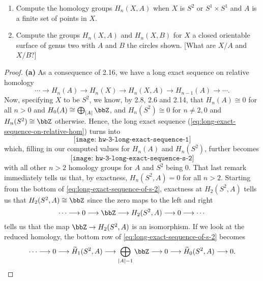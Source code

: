 \begin{problem}[Hatcher {\S}2.1, Ex.\@ 17]
\begin{enumerate}[label=(\alph*)]
\item Compute the homology groups $H_n(X,A)$ when $X$ is $S^2$ or
  $S^1\times S^1$ and $A$ is a finite set of points in $X$.
\item Compute the groups $H_n(X,A)$ and $H_n(X,B)$ for $X$ a closed
  orientable surface of genus two with $A$ and $B$ the circles shown. [What
  are $X/A$ and $X/B$?]
\end{enumerate}
\end{problem}
\begin{proof}
\textbf{(a)} As a consequence of 2.16, we have a long exact sequence on relative
homology
\begin{equation}
\label{eq:long-exact-sequence-on-relative-hom}
\cdots\longrightarrow
H_n(A)\longrightarrow
H_n(X)\longrightarrow
H_n(X,A)\longrightarrow
H_{n-1}(A)\longrightarrow
\cdots.
\end{equation}
Now, specifying $X$ to be $S^2$, we know, by 2.8, 2.6 and 2.14, that
$H_n(A)\cong 0$ for all $n>0$ and $H_0(A)\cong \bigoplus_{|A|}\bbZ$, and
$H_n(S^2)\cong 0$ for $n\neq 2,0$ and $H_n(S^2)\cong\bbZ$ otherwise. Hence,
the long exact sequence (\ref{eq:long-exact-sequence-on-relative-hom})
turns into
\begin{equation}
\label{eq:long-exact-sequence}
\texttt{[image: hw-3-long-exact-sequence-1]}
\end{equation}
which, filling in our computed values for $H_n(A)$ and $H_n(S^2)$, further
becomes
\begin{equation}
\label{eq:long-exact-sequence-of-s-2}
\texttt{[image: hw-3-long-exact-sequence-s-2]}
\end{equation}
with all other $n>2$ homology groups for $A$ and $S^2$ being $0$. That last
remark immediately tells us that, by exactness, $H_n(S^2,A)=0$ for all
$n>2$. Starting from the bottom of \eqref{eq:long-exact-sequence-of-s-2},
exactness at $H_2(S^2,A)$ tells us that $H_2(S^2,A)\cong\bbZ$ since the
zero maps to the left and right
\[
\cdots\longrightarrow 0\longrightarrow \bbZ\longrightarrow H_2(S^2,A)\longrightarrow 0\longrightarrow\cdots
\]
tells us that the map $\bbZ\to H_2(S^2,A)$ is an isomorphism. If we look at
the reduced homology, the bottom row of
\eqref{eq:long-exact-sequence-of-s-2} becomes
\[
\cdots\longrightarrow
0\longrightarrow
\widetilde H_1(S^2,A)\longrightarrow
\bigoplus_{|A|-1}\bbZ\longrightarrow
0\longrightarrow\widetilde H_0(S^2,A)
\longrightarrow 0.
\]
\end{proof}
